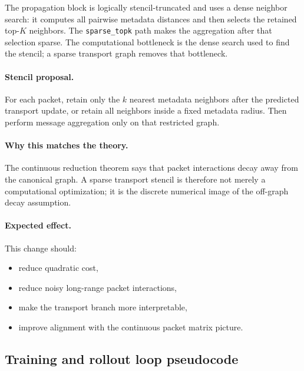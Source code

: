 The propagation block is logically stencil-truncated and uses a dense neighbor search: it computes all pairwise metadata distances and then selects the retained top-$K$ neighbors. The \texttt{sparse\_topk} path makes the aggregation after that selection sparse. The computational bottleneck is the dense search used to find the stencil; a sparse transport graph removes that bottleneck.

\paragraph{Stencil proposal.}
For each packet, retain only the $k$ nearest metadata neighbors after the predicted transport update, or retain all neighbors inside a fixed metadata radius. Then perform message aggregation only on that restricted graph.

\paragraph{Why this matches the theory.}
The continuous reduction theorem says that packet interactions decay away from the canonical graph. A sparse transport stencil is therefore not merely a computational optimization; it is the discrete numerical image of the off-graph decay assumption.

\paragraph{Expected effect.}
This change should:
\begin{itemize}
\item reduce quadratic cost,
\item reduce noisy long-range packet interactions,
\item make the transport branch more interpretable,
\item improve alignment with the continuous packet matrix picture.
\end{itemize}

\subsection{Training and rollout loop pseudocode}


